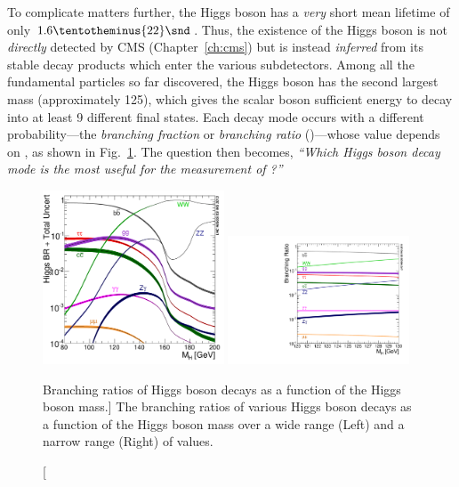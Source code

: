 To complicate matters further, the Higgs boson has a \emph{very} short mean lifetime of only $1.6 \tentotheminus{22}\snd$. %
Thus, the existence of the Higgs boson is not \emph{directly} detected by CMS (Chapter~\ref{ch:cms}) but is instead \emph{inferred} from its stable decay products which enter the various subdetectors.
Among all the fundamental particles so far discovered, the Higgs boson has the second largest mass (approximately 125\GeV),
which gives the scalar boson sufficient energy to decay into at least 9 different final states.
Each decay mode occurs with a different probability---the \emph{branching fraction} or \emph{branching ratio} (\br)---whose value depends on \mH, as shown in Fig.~\ref{fig:higgs_br}.
The question then becomes, \emph{``Which Higgs boson decay mode is the most useful for the measurement of \mH?''}
\begin{figure}[!htbp]
    \begin{center}
		\includegraphics[width=0.48\textwidth]{figures/higgsmassmeas/higgs_BR_80to200GeV.pdf}
		\includegraphics[width=0.48\textwidth]{figures/higgsmassmeas/higgs_BR_120to130GeV.pdf}
		\caption
			[Branching ratios of Higgs boson decays as a function of the Higgs boson mass.]
			{
            The branching ratios of various Higgs boson decays as a function of the Higgs boson mass
            over a wide range (Left) and a narrow range (Right) of values.
            }
		\label{fig:higgs_br}
	\end{center}
\end{figure} 
